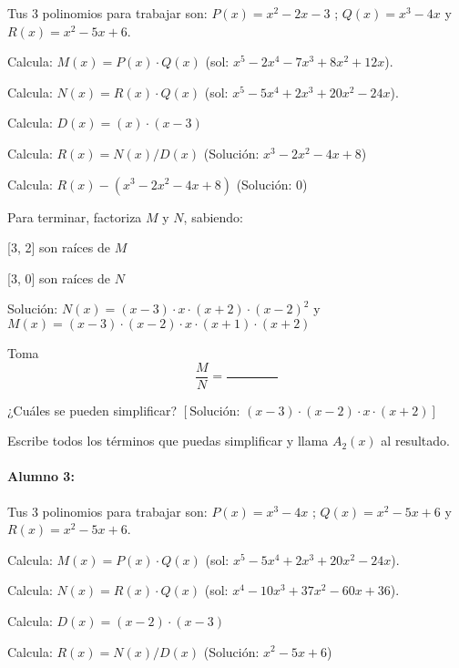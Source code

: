 Tus 3 polinomios para trabajar son: $P(x) =  x^2 - 2x - 3 $ ; $Q(x) =  x^3 - 4x $ y $R(x) =  x^2 - 5x + 6 $.



Calcula: $M(x) = P(x)\cdot  Q(x)$ (sol: $ x^5 - 2x^4 - 7x^3 + 8x^2 + 12x $).

Calcula: $N(x) = R(x)\cdot  Q(x)$ (sol: $ x^5 - 5x^4 + 2x^3 + 20x^2 - 24x $).

Calcula: $D(x) = ( x )\cdot  ( x - 3 )$

Calcula: $R(x) = N(x) / D(x)$ (Solución: $ x^3 - 2x^2 - 4x + 8 $)

Calcula: $R(x) - ( x^3 - 2x^2 - 4x + 8 )$ (Solución: $ 0 $)

Para terminar, factoriza $M$ y $N$, sabiendo:

     [3, 2]  son raíces de $M$

     [3, 0]  son raíces de $N$

Solución: $N(x) =  (x - 3) \cdot  x \cdot  (x + 2) \cdot  (x - 2)^2 $ y $M(x) =  (x - 3) \cdot  (x - 2) \cdot  x \cdot  (x + 1) \cdot  (x + 2) $

Toma \[\frac{M}{N} = \frac{\quad\quad\quad\quad}{\quad\quad\quad\quad}\]

¿Cuáles se pueden simplificar? $\left[\text{Solución: } (x - 3) \cdot  (x - 2) \cdot  x \cdot  (x + 2) \right]$

Escribe todos los términos que puedas simplificar y llama $A_2(x)$ al resultado.













\paragraph{Alumno 3:\\}



Tus 3 polinomios para trabajar son: $P(x) =  x^3 - 4x $ ; $Q(x) =  x^2 - 5x + 6 $ y $R(x) =  x^2 - 5x + 6 $.



Calcula: $M(x) = P(x)\cdot  Q(x)$ (sol: $ x^5 - 5x^4 + 2x^3 + 20x^2 - 24x $).

Calcula: $N(x) = R(x)\cdot  Q(x)$ (sol: $ x^4 - 10x^3 + 37x^2 - 60x + 36 $).

Calcula: $D(x) = ( x - 2 )\cdot  ( x - 3 )$

Calcula: $R(x) = N(x) / D(x)$ (Solución: $ x^2 - 5x + 6 $)

